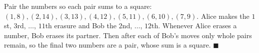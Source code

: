 Pair the numbers so each pair sums to a square: $(1,8),(2,14),(3,13),(4,12),(5,11),(6,10),(7,9)$. Alice makes the $1$st, $3$rd, $\dots$, $11$th erasure and Bob the $2$nd, $\dots$, $12$th. Whenever Alice erases a number, Bob erases its partner. Then after each of Bob's moves only whole pairs remain, so the final two numbers are a pair, whose sum is a square. $\blacksquare$
